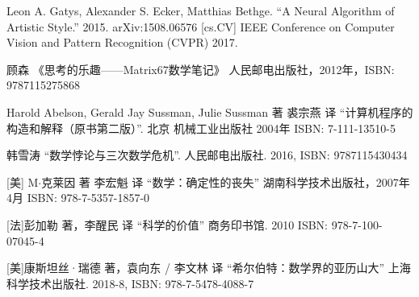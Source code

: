 \documentclass[b5paper]{ctexart}
\begin{document}
\begin{thebibliography}{99}

Leon A. Gatys, Alexander S. Ecker, Matthias Bethge. ``A Neural Algorithm of Artistic Style.'' 2015. arXiv:1508.06576 [cs.CV] IEEE Conference on Computer Vision and Pattern Recognition (CVPR) 2017.

顾森 《思考的乐趣——Matrix67数学笔记》 人民邮电出版社，2012年，ISBN: 9787115275868

Harold Abelson, Gerald Jay Sussman, Julie Sussman 著 裘宗燕 译 ``计算机程序的构造和解释（原书第二版）''. 北京 机械工业出版社 2004年 ISBN: 7-111-13510-5

韩雪涛 ``数学悖论与三次数学危机''. 人民邮电出版社. 2016, ISBN: 9787115430434

[美] M$\cdot$克莱因 著 李宏魁 译 ``数学：确定性的丧失'' 湖南科学技术出版社，2007年4月 ISBN: 978-7-5357-1857-0

[法]彭加勒 著，李醒民 译 ``科学的价值'' 商务印书馆. 2010 ISBN: 978-7-100-07045-4

[美]康斯坦丝·瑞德 著，袁向东 / 李文林 译 ``希尔伯特：数学界的亚历山大'' 上海科学技术出版社. 2018-8, ISBN: 978-7-5478-4088-7

\end{thebibliography}

\expandafter\enddocument

\fi
\end{document}
